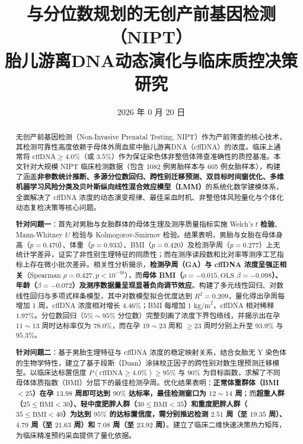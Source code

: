 ﻿\documentclass[12pt,a4paper]{article}
\title{\Large 与分位数规划的无创产前基因检测（NIPT）\\胎儿游离DNA动态演化与临床质控决策研究}
\date{2026 年 0 月 20 日}
\begin{document}
\maketitle




\begin{abstract}
无创产前基因检测（Non-Invasive Prenatal Testing, NIPT）作为产前筛查的核心技术，其检测可靠性高度依赖于母体外周血浆中胎儿游离DNA（cffDNA）的浓度。临床上通常将 $\text{cffDNA} \ge 4.0\%$（或 $3.5\%$）作为保证染色体非整倍体筛查准确性的质控基准。本文针对大规模 NIPT 临床检测数据（包含 1082 例男胎样本与 605 例女胎样本），构建了涵盖\textbf{非参数统计推断、多源分位数回归、跨性别迁移预测、双目标时间窗优化、多维机器学习风险分类及贝叶斯纵向线性混合效应模型（LMM）}的系统化数学建模体系，全面解决了 cffDNA 浓度的动态演变规律、最佳采血时机、非整倍体风险量化与个体化动态复检决策等核心问题。



\textbf{针对问题一}：首先对男胎与女胎群体的母体生理及测序质量指标实施 Welch's $t$ \textbf{检验}、Mann-Whitney $U$ 检验与 Kolmogorov-Smirnov 检验。结果表明，男胎与女胎在母体身高（$p=0.470$）、体重（$p=0.933$）、BMI（$p=0.420$）及检测孕周（$p=0.277$）上无统计学差异，证实了非性别生理特征的同质性；而在测序读段数和比对率等测序工艺指标上存在微小批次差异。相关性分析揭示，\textbf{检测孕周（GA）与 cffDNA 浓度呈强正相关}（Spearman $\rho = 0.427, p < 10^{-48}$），而\textbf{母体 BMI（$\rho = -0.015, \text{OLS } \beta = -0.098$）、年龄（$\beta = -0.072$）及测序数据量呈现显著负向调节效应}。构建了多元线性回归、对数线性回归与多项式样条模型，其中对数模型拟合优度达到 $R^2 = 0.209$，量化得出孕周每增加 1 周，cffDNA 浓度相对增长 $4.46\%$；BMI 每增加 $1\text{ kg/m}^2$，cffDNA 相对稀释 $1.97\%$。分位数回归（$5\%\sim 95\%$ 分位数）完整刻画了浓度下界包络线，并揭示出在孕 $11\sim 13$ 周时达标率仅为 $78.0\%$，而在孕 $19\sim 23$ 周和 $\ge 23$ 周时分别上升至 $93.9\%$ 与 $95.3\%$。




\textbf{针对问题二}：基于男胎生理特征与 cffDNA 浓度的稳定映射关系，结合女胎无 Y 染色体的生物学特性，建立了基于段斯（Duan）涂抹校正因子的跨性别对数生理预测迁移模型。以临床达标置信度 $P(\text{cffDNA} \ge 4.0\%) \ge 95\%$ 与 $90\%$ 为目标函数，求解了不同母体体质指数（BMI）分层下的最佳检测孕周。优化结果表明：\textbf{正常体重群体（BMI $< 25$）在孕 $13.98$ 周即可达到 $90\%$ 达标率，最佳检测窗口为 $12\sim 14$ 周}；而\textbf{超重人群（$25 \le \text{BMI} < 30$）、轻中度肥胖人群（$30 \le \text{BMI} < 35$）和重度肥胖人群（$35 \le \text{BMI} < 40$）为达到 $95\%$ 的达标置信度，需分别推迟检测 $2.51$ 周（至 $19.35$ 周）、$4.79$ 周（至 $21.63$ 周）和 $7.08$ 周（至 $23.92$ 周）}。建立了临床二维快速决策热力矩阵，为临床精准预约采血提供了量化依据。





\end{abstract}
\end{document}
